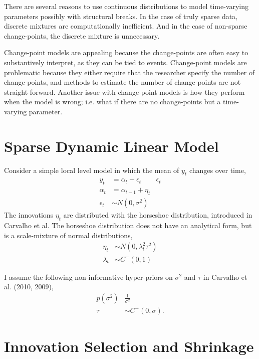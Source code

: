 \documentclass{article}
\begin{document}
There are several reasons to use continuous distributions to model time-varying parameters possibly with structural breaks.
In the case of truly sparse data, discrete mixtures are computationally inefficient. 
And in the case of non-sparse change-points, the discrete mixture is unnecessary.

Change-point models are appealing because the change-points are often easy to substantively interpret, as they can be tied to events.
Change-point models are problematic because they either require that the researcher specify the number of change-points, and methods to estimate the number of change-points are not straight-forward.
Another issue with change-point models is how they perform when the model is wrong; i.e. what if there are no change-points but a time-varying parameter.

\section{Sparse Dynamic Linear Model}

Consider a simple local level model in which the mean of $y_{t}$ changes over time,
\begin{align}
  \label{eq:8}
  y_t &= \alpha_t + \epsilon_t & \epsilon_{t}  \\
  \label{eq:14}
  \alpha_t &= \alpha_{t-1} + \eta_{t} \\
  \label{eq:15}
  \epsilon_{t} & \sim N(0, \sigma^{2})
\end{align}
The innovations $\eta_{t}$ are distributed with the horseshoe distribution, introduced in Carvalho et al.
The horseshoe distribution does not have an analytical form, but is a scale-mixture of normal distributions,
\begin{align}
  \label{eq:12}
  \eta_{t} &\sim N(0, \lambda_{t}^{2} \tau^{2}) \\
  \label{eq:13}
  \lambda_{t} &\sim C^{+}(0, 1)
\end{align}

I assume the following non-informative hyper-priors on $\sigma^{2}$ and $\tau$ in Carvalho et al. (2010, 2009),
\begin{align}
  \label{eq:9}
  p(\sigma^{2}) & \frac{1}{\sigma^{2}}  \\
  \label{eq:11}
  \tau &\sim C^{+}(0, \sigma) \text{.}
\end{align}

\section{Innovation Selection and Shrinkage}
\label{sec:time-vary-param}
\end{document}
